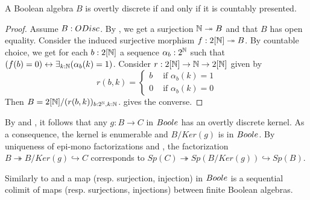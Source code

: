 \begin{corollary}\label{ODiscBAareBoole}
  A Boolean algebra $B$ is overtly discrete if and only if it is countably presented. 
\end{corollary}
\begin{proof}
  Assume $B:\ODisc$. 
  By , we get a surjection $\mathbb{N}\twoheadrightarrow B$ and that $B$ has open equality. 
  Consider the induced surjective morphism $f:2[\mathbb{N}]\twoheadrightarrow B$.
  By countable choice, we get for each $b:2[\mathbb{N}]$
  a sequence $\alpha_{b}:2^{\mathbb{N}}$ such that 
  $(f(b) = 0)\leftrightarrow \exists_{k:\mathbb{N}} (\alpha_{b}(k) =1)$. 
  Consider 
  $r:2[\mathbb{N}] \to \mathbb{N} \to 2[\mathbb{N}]$ 
  given by 
  \[r(b,k) =\begin{cases}
    b &\text{ if } \alpha_{b}(k) = 1\\
    0   &\text{ if } \alpha_{b}(k) = 0
  \end{cases}
  \] 
  Then $B= 2[\mathbb{N}]/(r(b,k))_{b:2^{\mathbb{N}},k:\mathbb{N}}$.
   gives the converse.
\end{proof}

\begin{remark}\label{BooleEpiMono}
  By  and , 
  it follows that any 
  $g:B\to C$ in $\Boole$ has an overtly discrete kernel.
  As a consequence, the kernel is enumerable and $B/Ker(g)$ is in $\Boole$. 
  By uniqueness of epi-mono factorizations and , 
  the factorization 
  $B\twoheadrightarrow B/Ker(g) \hookrightarrow C$ corresponds to 
  $Sp(C) \twoheadrightarrow Sp(B/Ker(g)) \hookrightarrow Sp(B)$. 
\end{remark}
\begin{remark}\label{decompositionBooleMaps}
  Similarly to  and 
    a map (resp. surjection, injection) 
  in $\Boole$ is a sequential colimit of maps (resp. surjections, injections) between 
  finite Boolean algebras. 
\end{remark}
